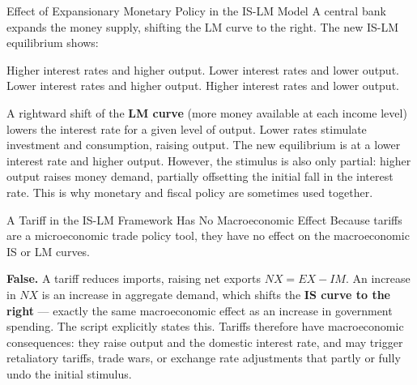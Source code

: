 \documentclass[paper=a5]{scrartcl}
\begin{document}
\begin{question}[type=mc]{Effect of Expansionary Monetary Policy in the IS-LM
  Model}
A central bank expands the money supply, shifting the LM curve to the right.
The new IS-LM equilibrium shows:
\begin{choices}
  \choice        Higher interest rates and higher output.
  \choice        Lower interest rates and lower output.
  \correctchoice Lower interest rates and higher output.
  \choice        Higher interest rates and lower output.
\end{choices}
\begin{solution}
  A rightward shift of the \textbf{LM curve} (more money available at each
  income level) lowers the interest rate for a given level of output. Lower
  rates stimulate investment and consumption, raising output. The new
  equilibrium is at a lower interest rate and higher output. However, the
  stimulus is also only partial: higher output raises money demand, partially
  offsetting the initial fall in the interest rate. This is why monetary and
  fiscal policy are sometimes used together.
\end{solution}
\end{question}

\begin{question}[type=tf]{A Tariff in the IS-LM Framework Has No Macroeconomic
  Effect}
Because tariffs are a microeconomic trade policy tool, they have no effect
on the macroeconomic IS or LM curves.
\truefalse[false]
\begin{solution}
  \textbf{False.} A tariff reduces imports, raising net exports
  $NX = EX - IM$. An increase in $NX$ is an increase in aggregate demand,
  which shifts the \textbf{IS curve to the right} --- exactly the same
  macroeconomic effect as an increase in government spending. The script
  explicitly states this. Tariffs therefore have macroeconomic consequences:
  they raise output and the domestic interest rate, and may trigger retaliatory
  tariffs, trade wars, or exchange rate adjustments that partly or fully undo
  the initial stimulus.
\end{solution}
\end{question}
\end{document}
